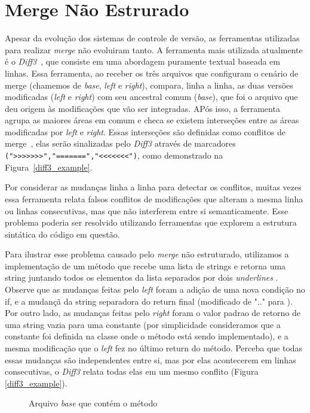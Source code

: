 \section{Merge Não Estrurado}
Apesar da evolução dos sistemas de controle de versão, as ferramentas utilizadas para realizar
\emph{merge} não evoluiram tanto. A ferramenta mais utilizada atualmente é o \emph{Diff3}~\cite{mens02}, que consiste em uma
abordagem puramente textual baseada em linhas. Essa ferramenta, ao receber os três arquivos que configuram o cenário de merge
(chamemos de \emph{base}, \emph{left} e \emph{right}), compara, linha a linha, as duas versões modificadas
(\emph{left} e \emph{right}) com seu ancestral comum (\emph{base}), que foi o arquivo que deu origem às modificações
que vão ser integradas. APós isso, a ferramenta agrupa as maiores áreas em comum e checa se existem interseções entre as
áreas modificadas por \emph{left} e \emph{right}. Essas interseções são definidas como conflitos de merge~\cite{khan07},
elas serão sinalizadas pelo \emph{Diff3} através de marcadores \verb|(">>>>>>>","=======","<<<<<<<")|, como demonstrado na
Figura~\ref{diff3_example}.

Por considerar as mudanças linha a linha para detectar os conflitos, muitas vezes essa ferramenta relata falsos conflitos
de modificações que alteram a mesma linha ou linhas consecutivas, mas que não interferem entre si semanticamente.
Esse problema poderia ser resolvido utilizando ferramentas que explorem a estrutura sintática do código em questão.

Para ilustrar esse problema causado pelo \emph{merge} não estruturado, utilizamos a implementação de um método
 que
recebe uma lista de strings e retorna uma string juntando todos os elementos da lista separados por dois
\emph{underlines} . Observe que as mudanças feitas pelo \emph{left} foram a adição de uma nova
condição no if, e a mudançã da string separadora do return final (modificado de ".." para ). Por outro lado,
as mudanças feitas pelo \emph{right} foram o valor padrao de retorno de uma string vazia para uma constante (por simplicidade
consideramos que a constante foi definida na classe onde o método está sendo implementado), e a mesma
modificação que o \emph{left} fez no último return do método. Perceba que todas essas mudanças são independentes entre si,
mas por elas acontecerem em linhas consecutivas, o \emph{Diff3} relata todas elas em um mesmo conflito (Figura
\ref{diff3_example}).

\begin{figure}[ht]
	\begin{center}
		
		\caption{Arquivo \emph{base} que contém o método }\label{base_example}
	\end{center}
\end{figure}

